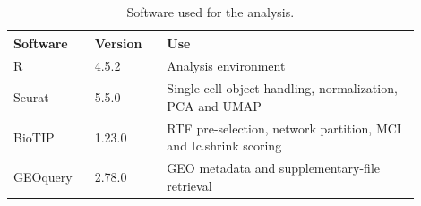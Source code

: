 \begin{table}[H]
\centering
\caption{Software used for the analysis.}
\label{tab:software}
\begin{tabular}{p{0.18\linewidth}p{0.16\linewidth}p{0.56\linewidth}}
\toprule
Software & Version & Use
\\
\midrule
R & 4.5.2 & Analysis environment\\
Seurat & 5.5.0 & Single-cell object handling, normalization, PCA and UMAP\\
BioTIP & 1.23.0 & RTF pre-selection, network partition, MCI and Ic.shrink scoring\\
GEOquery & 2.78.0 & GEO metadata and supplementary-file retrieval\\
\bottomrule
\end{tabular}
\end{table}
